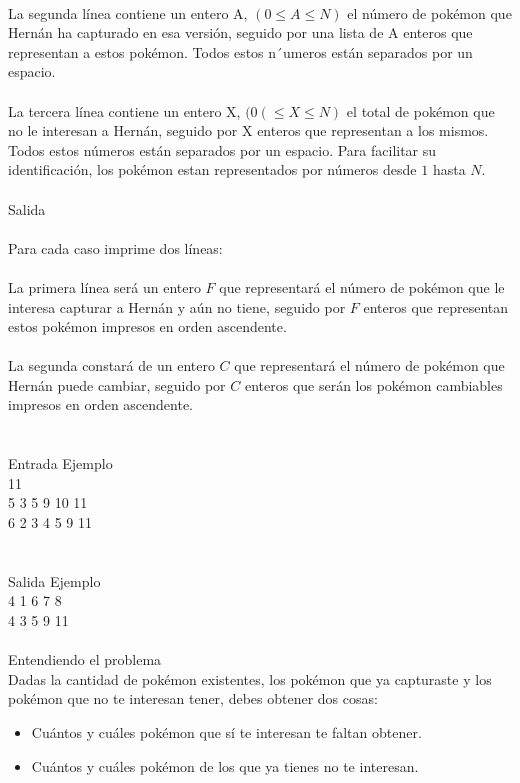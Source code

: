 \documentclass[12pt]{article}
\begin{document}
\\La segunda línea contiene un entero A, $(0 ≤ A ≤ N)$ el número de pokémon que Hernán ha capturado en esa versión, seguido por una lista de A enteros que representan a estos pokémon. Todos estos n´umeros están separados por un espacio.\\
\\La tercera línea contiene un entero X, $(0 (≤ X ≤ N)$ el total de pokémon que no le interesan a Hernán, seguido por X enteros que representan a los mismos. Todos estos números están separados por un espacio. Para facilitar su identificación, los pokémon estan representados por números desde $1$ hasta $N$.\\
\\
\textrm{\large Salida}
\\
\\Para cada caso imprime dos líneas:\\
\\La primera línea será un entero $F$ que representará el número de pokémon que le interesa capturar a Hernán y aún no tiene, seguido por $F$ enteros que representan estos pokémon impresos en orden ascendente.\\
\\La segunda constará de un entero $C$ que representará el número de pokémon que Hernán puede cambiar, seguido por $C$ enteros que serán los pokémon cambiables impresos en orden ascendente.\\
\\
\\
\textrm{\large Entrada Ejemplo}
\\
11\\
5 3 5 9 10 11\\
6 2 3 4 5 9 11\\
\\
\\
\textrm{\large Salida Ejemplo}
\\
4 1 6 7 8\\
4 3 5 9 11\\
\\
\textrm{\large Entendiendo el problema}\\
Dadas la cantidad de pokémon existentes, los pokémon que ya capturaste y los pokémon que no te interesan tener, debes obtener dos cosas:
\begin{itemize}
\item Cuántos y cuáles pokémon que sí te interesan te faltan obtener.
\item Cuántos y cuáles pokémon de los que ya tienes no te interesan.
\end{itemize}
\end{document}
